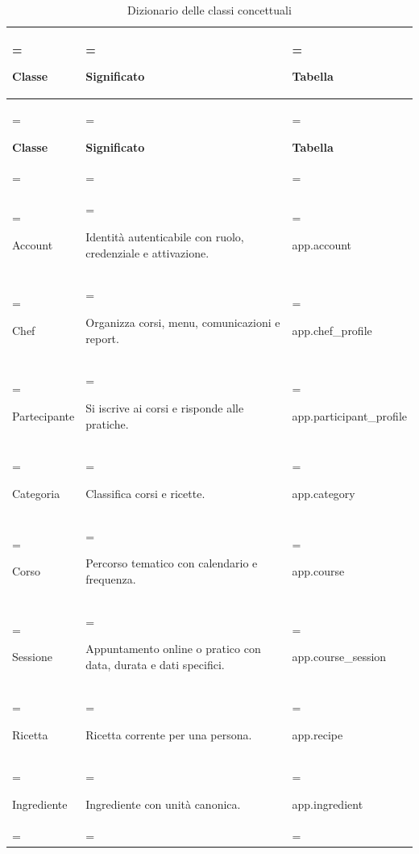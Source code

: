 \documentclass[11pt,a4paper]{article}
\begin{document}
{\small \renewcommand{\arraystretch}{1.2}

\begin{xltabular}{\linewidth}{>{\hsize\linewidth=\hsize\raggedright\arraybackslash}X>{\hsize\linewidth=\hsize\raggedright\arraybackslash}X>{\hsize\linewidth=\hsize\raggedright\arraybackslash}X}
\caption{Dizionario delle classi concettuali}\label{tab:dictionary-2}\\
\toprule

\textbf{Classe} & \textbf{Significato} & \textbf{Tabella}\\\midrule\endfirsthead\toprule\textbf{Classe} & \textbf{Significato} & \textbf{Tabella}\\\midrule\endhead
\midrule{}\\\endfoot\bottomrule\endlastfoot


Account & Identità autenticabile con ruolo, credenziale e attivazione. & {\ttfamily\small app.\allowbreak{}account}\\\addlinespace[3pt]

Chef & Organizza corsi, menu, comunicazioni e report. & {\ttfamily\small app.\allowbreak{}chef\_\allowbreak{}profile}\\\addlinespace[3pt]

Partecipante & Si iscrive ai corsi e risponde alle pratiche. & {\ttfamily\small app.\allowbreak{}participant\_\allowbreak{}profile}\\\addlinespace[3pt]

Categoria & Classifica corsi e ricette. & {\ttfamily\small app.\allowbreak{}category}\\\addlinespace[3pt]

Corso & Percorso tematico con calendario e frequenza. & {\ttfamily\small app.\allowbreak{}course}\\\addlinespace[3pt]

Sessione & Appuntamento online o pratico con data, durata e dati specifici. & {\ttfamily\small app.\allowbreak{}course\_\allowbreak{}session}\\\addlinespace[3pt]

Ricetta & Ricetta corrente per una persona. & {\ttfamily\small app.\allowbreak{}recipe}\\\addlinespace[3pt]

Ingrediente & Ingrediente con unità canonica. & {\ttfamily\small app.\allowbreak{}ingredient}\\\addlinespace[3pt]


\end{xltabular}}
\end{document}

